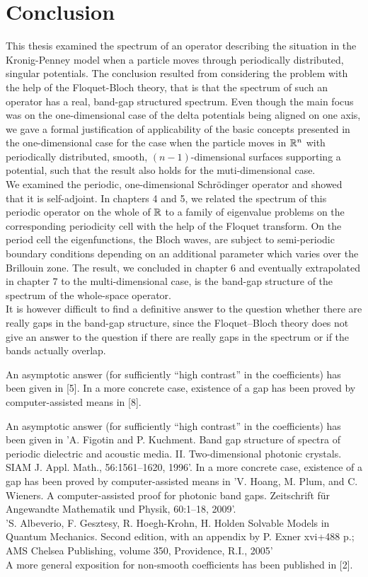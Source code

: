 \chapter{Conclusion} \label{chap:8}
	
This thesis examined the spectrum of an operator describing the situation in the Kronig-Penney model when a particle moves through periodically distributed, singular potentials. The conclusion resulted from considering the problem with the help of the Floquet-Bloch theory, that is that the spectrum of such an operator has a real, band-gap structured spectrum. Even though the main focus was on the one-dimensional case of the delta potentials being aligned on one axis, we gave a formal justification of applicability of the basic concepts presented in the one-dimensional case for the case when the particle moves in $\mathbb{R}^{n}$ with periodically distributed, smooth, $(n-1)$-dimensional surfaces supporting a potential, such that the result also holds for the muti-dimensional case. 
~\\

We examined the periodic, one-dimensional Schrödinger operator and showed that it is self-adjoint. In chapters 4 and 5, we related the spectrum of this periodic operator on the whole of $\mathbb{R}$ to a family of eigenvalue problems on the corresponding periodicity cell with the help of the Floquet transform. On the period cell the eigenfunctions, the Bloch waves, are subject to semi-periodic boundary conditions depending on an additional parameter which varies over the Brillouin zone. The result, we concluded in chapter 6 and eventually extrapolated in chapter 7 to the multi-dimensional case, is the band-gap structure of the spectrum of the whole-space operator.
~\\

It is however difficult to find a definitive answer to the question whether there are really gaps in the band-gap structure, since the Floquet–Bloch theory does not give an answer to the question if there are really gaps in the spectrum or if the bands actually overlap. 


 An asymptotic answer (for sufficiently “high contrast” in the coefficients) has been given in [5]. 
 In a more concrete case, existence of a gap has been proved by computer-assisted means in [8]. 
 
An asymptotic answer (for sufficiently “high contrast” in the coefficients) has been given in 'A. Figotin and P. Kuchment. Band gap structure of spectra of periodic dielectric and acoustic media. II. Two-dimensional photonic crystals. SIAM J. Appl. Math., 56:1561–1620, 1996'. In a more concrete case, existence of a gap has been proved by computer-assisted means in 'V. Hoang, M. Plum, and C. Wieners. A computer-assisted proof for photonic band gaps. Zeitschrift für Angewandte Mathematik und Physik, 60:1–18, 2009'.
~\\
'S. Albeverio, F. Gesztesy, R. Hoegh-Krohn, H. Holden Solvable Models in Quantum Mechanics. Second edition, with an appendix by P. Exner xvi+488 p.; AMS Chelsea Publishing, volume 350, Providence, R.I., 2005'
~\\
A more general exposition for non-smooth coefficients has been published in [2].
~\\

